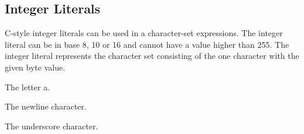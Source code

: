 
\subsection{Integer Literals}
{
	C-style integer literals can be used in a character-set expressions.
	The integer literal can be in base 8, 10 or 16 and cannot have a value
	higher than 255.
	The integer literal represents the character set consisting of the one
	character with the given byte value.
	
	\begin{itemize}
	{
		\item[\texttt{95}] The letter a.
		
		\item[\texttt{012}] The newline character.
		
		\item[\texttt{0x5F}] The underscore character.
	}
	\end{itemize}
}
